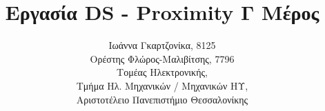 
\usepackage{polyglossia}
\setmainlanguage{greek}

\usepackage{fontspec}
\setmainfont[Mapping=tex-text]{DejaVu Sans}
\newfontfamily{}
\newfontfamily{}
\setmonofont[Scale=1.0]{Source Code Pro Medium}
\newfontfamily{}
\usepackage{microtype} %
\title{Εργασία DS - Proximity Γ Μέρος}
\author{Ιωάννα Γκαρτζονίκα, 8125\\
Ορέστης Φλώρος-Μαλιβίτσης, 7796\\
  Τομέας Ηλεκτρονικής,\\
  Τμήμα Ηλ. Μηχανικών / Μηχανικών ΗΥ,\\
  Αριστοτέλειο Πανεπιστήμιο Θεσσαλονίκης}

\maketitle
\tableofcontents
\listoffigures







